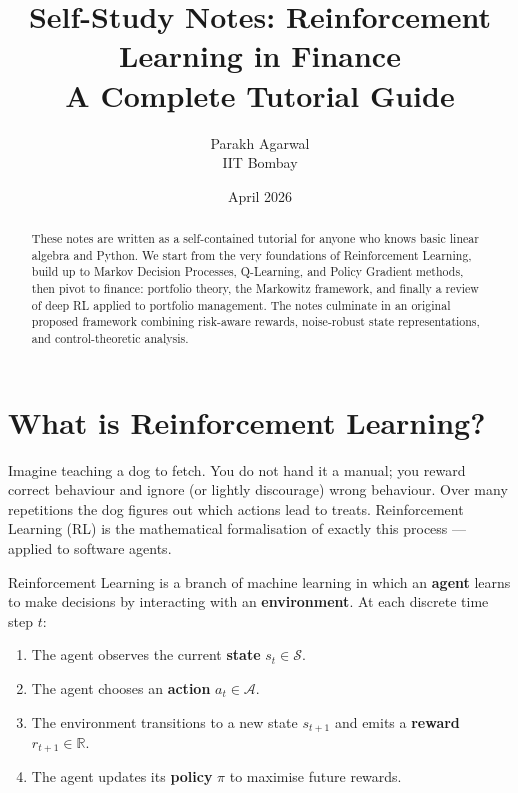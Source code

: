 \documentclass[12pt,a4paper]{article}
\title{%
  \textbf{Self-Study Notes: Reinforcement Learning in Finance}\\[4pt]
  \large A Complete Tutorial Guide
}
\author{Parakh Agarwal\\
  \small IIT Bombay}
\date{April 2026}
\begin{document}
\maketitle

\begin{abstract}
These notes are written as a self-contained tutorial for anyone who knows
basic linear algebra and Python.  We start from the very foundations of
Reinforcement Learning, build up to Markov Decision Processes, Q-Learning,
and Policy Gradient methods, then pivot to finance: portfolio theory,
the Markowitz framework, and finally a review of deep RL applied to portfolio
management.  The notes culminate in an original proposed framework combining
risk-aware rewards, noise-robust state representations, and control-theoretic
analysis.
\end{abstract}

\tableofcontents
\newpage

\section{What is Reinforcement Learning?}

\begin{insbox}
Imagine teaching a dog to fetch.  You do not hand it a manual; you
reward correct behaviour and ignore (or lightly discourage) wrong
behaviour.  Over many repetitions the dog figures out which actions
lead to treats.  Reinforcement Learning (RL) is the mathematical
formalisation of exactly this process --- applied to software agents.
\end{insbox}

Reinforcement Learning is a branch of machine learning in which an
\textbf{agent} learns to make decisions by interacting with an
\textbf{environment}.  At each discrete time step $t$:
\begin{enumerate}[nosep]
  \item The agent observes the current \textbf{state} $s_t \in \mathcal{S}$.
  \item The agent chooses an \textbf{action} $a_t \in \mathcal{A}$.
  \item The environment transitions to a new state $s_{t+1}$ and emits a
        \textbf{reward} $r_{t+1} \in \mathbb{R}$.
  \item The agent updates its \textbf{policy} $\pi$ to maximise future rewards.
\end{enumerate}
\end{document}

